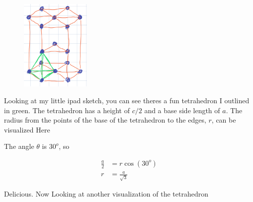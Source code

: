 \documentclass{article}
\begin{document}
\begin{figure}[H]
    \centering
    \includegraphics[width=0.3\textwidth]{hcp.jpeg}
\end{figure}

Looking at my little ipad sketch, you can see theres a fun tetrahedron I outlined in green. The tetrahedron has a height of $c/2$ and a base side length of $a$. The radius from the points of the base of the tetrahedron to the edges, $r$, can be visualized Here

\begin{figure}[H]
    \centering
\end{figure}

The angle $\theta$ is $30^o$, so

\begin{align*}
    \frac{a}{2} &= r \cos(30^o) \\
    r &= \frac{a}{\sqrt{3}}
\end{align*}

Delicious. Now Looking at another visualization of the tetrahedron
\end{document}

